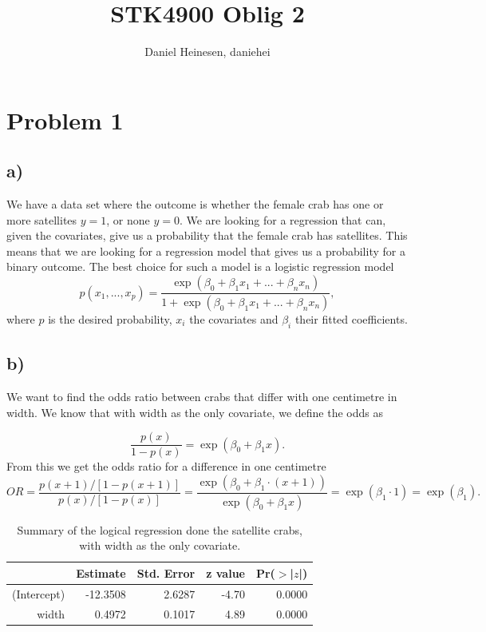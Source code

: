 \documentclass[a4paper,norsk, 10pt]{article}
\title{STK4900 Oblig 2}
\author{Daniel Heinesen, daniehei}
\begin{document}
\maketitle

\section{Problem 1}
\subsection{a)}
We have a data set where the outcome is whether the female crab has one or more satellites $y = 1$, or none $y=0$. We are looking for a regression that can, given the covariates, give us a probability that the female crab has satellites. This means that we are looking for a regression model that gives us a probability for a binary outcome. The best choice for such a model is a logistic regression model
\begin{equation}
p(x_1,...,x_p) = \frac{\exp(\beta_0 + \beta_1 x_1 + ... + \beta_n x_n)}{1+\exp(\beta_0 + \beta_1 x_1 + ... + \beta_n x_n)},
\end{equation}
where $p$ is the desired probability, $x_i$ the covariates and $\beta_i$ their fitted coefficients.

\subsection{b)}

We want to find the odds ratio between crabs that differ with one centimetre in width. We know that with width as the only covariate, we define the odds as 

\begin{equation}
\frac{p(x)}{1-p(x)} = \exp(\beta_0 + \beta_1 x).
\end{equation}
From this we get the odds ratio for a difference in one centimetre
\begin{equation}
OR = \frac{p(x+1)/[1-p(x+1)]}{p(x)/[1-p(x)]} = \frac{\exp(\beta_0 + \beta_1\cdot (x+1))}{\exp(\beta_0 + \beta_1 x)} = \exp(\beta_1\cdot 1) = \exp(\beta_1).
\end{equation}


\begin{table}[!ht]
\centering
\begin{tabular}{rrrrr}
  \hline
 & Estimate & Std. Error & z value & Pr($>$|$z$|) \\ 
  \hline
(Intercept) & -12.3508 & 2.6287 & -4.70 & 0.0000 \\ 
  width & 0.4972 & 0.1017 & 4.89 & 0.0000 \\ 
   \hline
\end{tabular}
\caption{Summary of the logical regression done the satellite crabs, with width as the only covariate.}\label{tab:crab_width}
\end{table}
\end{document}
